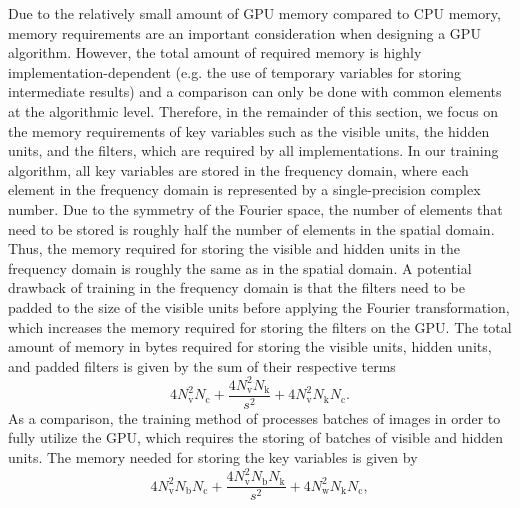 Due to the relatively small amount of GPU memory compared to CPU memory, memory
requirements are an important consideration when designing a GPU algorithm.
However, the total amount of required memory is highly implementation-dependent
(e.g. the use of temporary variables for storing intermediate results) and a
comparison can only be done with common elements at the algorithmic level.
Therefore, in the remainder of this section, we focus on the memory requirements
of key variables such as the visible units, the hidden units, and the filters,
which are required by all implementations. In our training algorithm, all key
variables are stored in the frequency domain, where each element in the
frequency domain is represented by a single-precision complex number. Due to the
symmetry of the Fourier space, the number of elements that need to be stored is
roughly half the number of elements in the spatial domain. Thus, the memory
required for storing the visible and hidden units in the frequency domain is
roughly the same as in the spatial domain. A potential drawback of training in
the frequency domain is that the filters need to be padded to the size of the
visible units before applying the Fourier transformation, which increases the
memory required for storing the filters on the GPU. The total amount of memory
in bytes required for storing the visible units, hidden units, and padded
filters is given by the sum of their respective terms
\begin{equation} 
4N_\text{v}^2N_\text{c} + \frac{4N_\text{v}^2 N_\text{k}}{s^2} +
4N_\text{v}^2N_\text{k}N_\text{c}.
\end{equation}
As a comparison, the training method of \cite{krizhevsky2012} processes batches
of images in order to fully utilize the GPU, which requires the storing of
batches of visible and hidden units. The memory needed for storing the key
variables is given by
\begin{equation} 
4N_\text{v}^2 N_\text{b}N_\text{c} + \frac{4N_\text{v}^2
N_\text{b}N_\text{k}}{s^2} + 4N_\text{w}^2N_\text{k}N_\text{c},
\end{equation}
